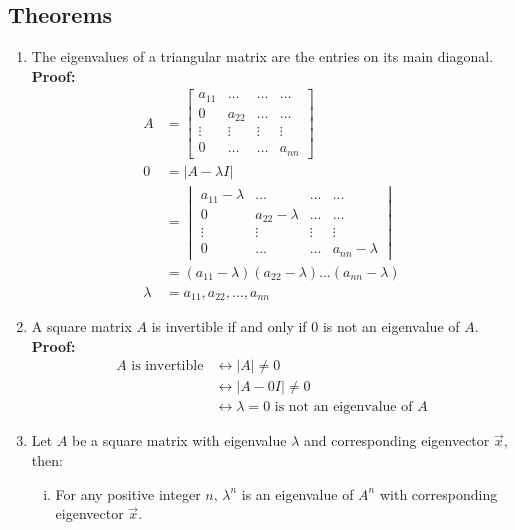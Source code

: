 \documentclass{math}
\begin{document}
\subsection*{Theorems}
\begin{enumerate}[Theorem 1.]
  \item The eigenvalues of a triangular matrix are the entries on its main
  diagonal. \\
  \textbf{Proof:}
  \begin{align*}
    A &= \begin{bmatrix}
      a_{11} & \dots & \dots & \dots \\
      0 & a_{22} & \dots & \dots \\
      \vdots & \vdots & \vdots & \vdots \\
      0 & \dots & \dots & a_{nn}
    \end{bmatrix} \\
    0 &= |A-\lambda I| \\
    &= \begin{vmatrix}
      a_{11}-\lambda & \dots & \dots & \dots \\
      0 & a_{22}-\lambda & \dots & \dots \\
      \vdots & \vdots & \vdots & \vdots \\
      0 & \dots & \dots & a_{nn}-\lambda
    \end{vmatrix} \\
    &= (a_{11}-\lambda)(a_{22}-\lambda)\dots(a_{nn}-\lambda) \\
    \lambda &= a_{11},a_{22},\dots,a_{nn}
  \end{align*}
  \item A square matrix \( A \) is invertible if and only if \( 0 \) is not
  an eigenvalue of \( A \). \\
  \textbf{Proof:}
  \begin{align*}
    A \text{ is invertible} &\leftrightarrow |A|\ne0 \\
    &\leftrightarrow |A-0I|\ne0 \\
    &\leftrightarrow \lambda = 0 \text{ is not an eigenvalue of } A
  \end{align*}
  \item Let \( A \) be a square matrix with eigenvalue \( \lambda \) and
  corresponding eigenvector \( \vec{x} \), then:
  \begin{enumerate}[(i)]
    \item For any positive integer \( n \), \( \lambda^n \) is an eigenvalue
    of \( A^n \) with corresponding eigenvector \( \vec{x} \). \\

\end{enumerate}
\end{enumerate}
\end{document}
